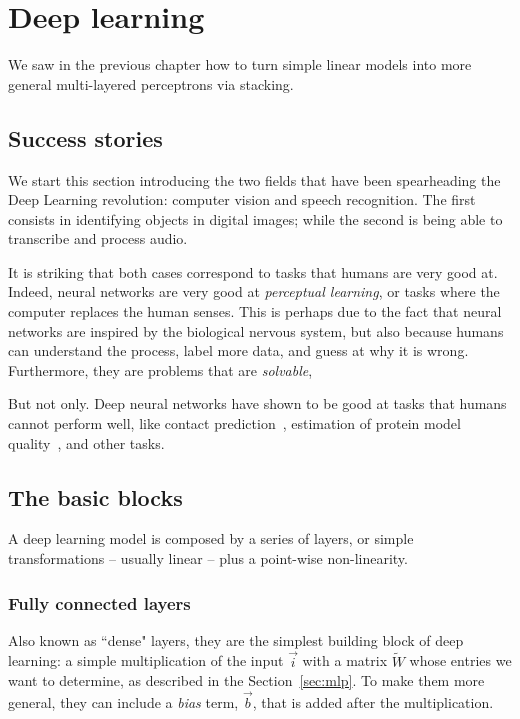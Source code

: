 \chapter{Deep learning}
We saw in the previous chapter how to turn simple linear models into more general multi-layered perceptrons via stacking.

\section{Success stories}
We start this section introducing the two fields that have been spearheading the Deep Learning revolution: computer vision and speech recognition.
The first consists in identifying objects in digital images; while the second is being able to transcribe and process audio.

It is striking that both cases correspond to tasks that humans are very good at.
Indeed, neural networks are very good at \emph{perceptual learning}, or tasks where the computer replaces the human senses.
This is perhaps due to the fact that neural networks are inspired by the biological nervous system, but also because humans can understand the process,
label more data, and guess at why it is wrong.
Furthermore, they are problems that are \emph{solvable},

But not only.
Deep neural networks have shown to be good at tasks that humans cannot perform well, like contact prediction~\citep{ultra_deep_contacts}, estimation of protein model quality~\citep{casp13_ema}, and other tasks.


\section{The basic blocks}
A deep learning model is composed by a series of layers, or simple transformations -- usually linear -- plus a point-wise non-linearity.


\subsection{Fully connected layers}
Also known as ``dense" layers, they are the simplest building block of deep learning: a simple multiplication of the input $\vec{i}$ with a matrix $\widetilde{W}$ whose entries we want to determine, as described in the Section~\ref{sec:mlp}.
To make them more general, they can include a \emph{bias} term, $\vec b$, that is added after the multiplication.

